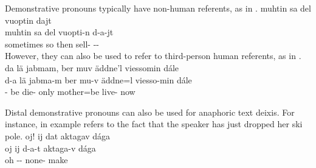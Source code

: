 Demonstrative pronouns typically have non-human referents, as in . 
\ea\label{demProWithNonHumanReferent1}%
\glll	muhtin sa del vuoptin dajt\\
	muhtin sa del vuopti-n d-a-jt\\
	sometimes so then sell- --\\\nopagebreak
{}	
\z
However, they can also be used to refer to third-person human referents, as in . 
\ea\label{demProWithHumanReferent1}
\glll	da lä jabmam, ber muv äddne'l viessomin dále\\
	d-a lä jabma-m ber mu-v äddne=l viesso-min dále\\
	-\BS{} be\BS{} die- only  mother\BS{}=be\BS{} live- now\\\nopagebreak
{}	
\z

Distal demonstrative pronouns can also be used for anaphoric text deixis. For instance,  in example  refers to the fact that the speaker has just dropped her ski pole. 
\ea\label{demProTextDeixis}%
\glll	oj! ij dat aktagav dága\\
	oj ij d-a-t aktaga-v dága\\
	oh \BS{} -- none- make\BS{}\\\nopagebreak
{}	
\z

